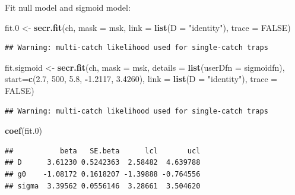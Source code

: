 \documentclass[
]{book}
\newenvironment{Shaded}{\begin{snugshade}}{\end{snugshade}}
\newcommand{\AttributeTok}[1]{\textcolor[rgb]{0.13,0.29,0.53}{#1}}
\newcommand{\ConstantTok}[1]{\textcolor[rgb]{0.56,0.35,0.01}{#1}}
\newcommand{\DecValTok}[1]{\textcolor[rgb]{0.00,0.00,0.81}{#1}}
\newcommand{\FloatTok}[1]{\textcolor[rgb]{0.00,0.00,0.81}{#1}}
\newcommand{\FunctionTok}[1]{\textcolor[rgb]{0.13,0.29,0.53}{\textbf{#1}}}
\newcommand{\NormalTok}[1]{#1}
\newcommand{\OtherTok}[1]{\textcolor[rgb]{0.56,0.35,0.01}{#1}}
\newcommand{\SpecialCharTok}[1]{\textcolor[rgb]{0.81,0.36,0.00}{\textbf{#1}}}
\newcommand{\StringTok}[1]{\textcolor[rgb]{0.31,0.60,0.02}{#1}}
\begin{document}
Fit null model and sigmoid model:

\begin{Shaded}
\begin{Highlighting}[]
\NormalTok{fit}\FloatTok{.0} \OtherTok{\textless{}{-}} \FunctionTok{secr.fit}\NormalTok{(ch, }\AttributeTok{mask =}\NormalTok{ msk, }\AttributeTok{link =} \FunctionTok{list}\NormalTok{(}\AttributeTok{D =} \StringTok{"identity"}\NormalTok{), }
    \AttributeTok{trace =} \ConstantTok{FALSE}\NormalTok{)}
\end{Highlighting}
\end{Shaded}

\begin{verbatim}
## Warning: multi-catch likelihood used for single-catch traps
\end{verbatim}

\begin{Shaded}
\begin{Highlighting}[]
\NormalTok{fit.sigmoid }\OtherTok{\textless{}{-}} \FunctionTok{secr.fit}\NormalTok{(ch, }\AttributeTok{mask =}\NormalTok{ msk, }\AttributeTok{details =} 
    \FunctionTok{list}\NormalTok{(}\AttributeTok{userDfn =}\NormalTok{ sigmoidfn), }\AttributeTok{start=}\FunctionTok{c}\NormalTok{(}\FloatTok{2.7}\NormalTok{, }\DecValTok{500}\NormalTok{, }\FloatTok{5.8}\NormalTok{, }\SpecialCharTok{{-}}\FloatTok{1.2117}\NormalTok{, }
    \FloatTok{3.4260}\NormalTok{), }\AttributeTok{link =} \FunctionTok{list}\NormalTok{(}\AttributeTok{D =} \StringTok{"identity"}\NormalTok{), }\AttributeTok{trace =} \ConstantTok{FALSE}\NormalTok{)}
\end{Highlighting}
\end{Shaded}

\begin{verbatim}
## Warning: multi-catch likelihood used for single-catch traps
\end{verbatim}

\begin{Shaded}
\begin{Highlighting}[]
\FunctionTok{coef}\NormalTok{(fit}\FloatTok{.0}\NormalTok{)}
\end{Highlighting}
\end{Shaded}

\begin{verbatim}
##           beta   SE.beta      lcl       ucl
## D      3.61230 0.5242363  2.58482  4.639788
## g0    -1.08172 0.1618207 -1.39888 -0.764556
## sigma  3.39562 0.0556146  3.28661  3.504620
\end{verbatim}
\end{document}
